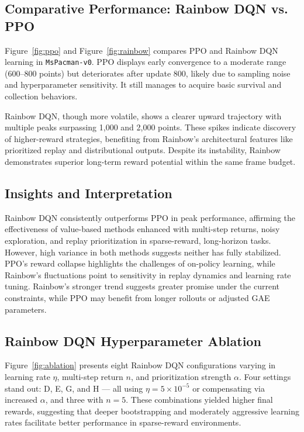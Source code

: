 \documentclass{article}
\begin{document}
\subsection{Comparative Performance: Rainbow DQN vs. PPO}

Figure~\ref{fig:ppo} and Figure~\ref{fig:rainbow} compares PPO and Rainbow DQN learning in \texttt{MsPacman-v0}. PPO displays early convergence to a moderate range (600–800 points) but deteriorates after update 800, likely due to sampling noise and hyperparameter sensitivity. It still manages to acquire basic survival and collection behaviors.

Rainbow DQN, though more volatile, shows a clearer upward trajectory with multiple peaks surpassing 1,000 and 2,000 points. These spikes indicate discovery of higher-reward strategies, benefiting from Rainbow’s architectural features like prioritized replay and distributional outputs. Despite its instability, Rainbow demonstrates superior long-term reward potential within the same frame budget.

\subsection{Insights and Interpretation}

Rainbow DQN consistently outperforms PPO in peak performance, affirming the effectiveness of value-based methods enhanced with multi-step returns, noisy exploration, and replay prioritization in sparse-reward, long-horizon tasks. However, high variance in both methods suggests neither has fully stabilized. PPO’s reward collapse highlights the challenges of on-policy learning, while Rainbow’s fluctuations point to sensitivity in replay dynamics and learning rate tuning. Rainbow’s stronger trend suggests greater promise under the current constraints, while PPO may benefit from longer rollouts or adjusted GAE parameters.

\subsection{Rainbow DQN Hyperparameter Ablation}

Figure~\ref{fig:ablation} presents eight Rainbow DQN configurations varying in learning rate \(\eta\), multi-step return \(n\), and prioritization strength \(\alpha\). Four settings stand out: D, E, G, and H — all using \(\eta = 5 \times 10^{-5}\) or compensating via increased \(\alpha\), and three with \(n = 5\). These combinations yielded higher final rewards, suggesting that deeper bootstrapping and moderately aggressive learning rates facilitate better performance in sparse-reward environments.
\end{document}

